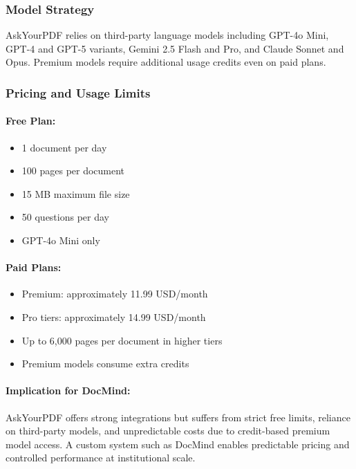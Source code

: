 \documentclass[12pt, a4paper, oneside]{report}
\begin{document}
\subsubsection{Model Strategy}

AskYourPDF relies on third-party language models including GPT-4o Mini, GPT-4 and GPT-5 variants, Gemini 2.5 Flash and Pro, and Claude Sonnet and Opus. Premium models require additional usage credits even on paid plans.

\subsubsection{Pricing and Usage Limits}

\paragraph{Free Plan:}
\begin{itemize}[noitemsep]
  \item 1 document per day
  \item 100 pages per document
  \item 15 MB maximum file size
  \item 50 questions per day
  \item GPT-4o Mini only
\end{itemize}

\newpage

\paragraph{Paid Plans:}
\begin{itemize}[noitemsep]
  \item Premium: approximately 11.99 USD/month
  \item Pro tiers: approximately 14.99 USD/month
  \item Up to 6,000 pages per document in higher tiers
  \item Premium models consume extra credits
\end{itemize}

\paragraph{Implication for DocMind:}

AskYourPDF offers strong integrations but suffers from strict free limits, reliance on third-party models, and unpredictable costs due to credit-based premium model access. A custom system such as DocMind enables predictable pricing and controlled performance at institutional scale.
\end{document}
